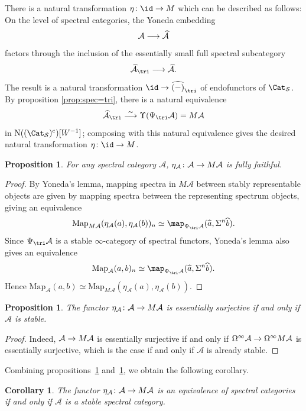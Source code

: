 \documentclass{amsart}
\renewcommand{\to}{\mathchoice{\longrightarrow}{\rightarrow}{\rightarrow}{\rightarrow}}
\newcommand{\cA}{{\mathcal A}}
\let\catsymbfont\mathcal
\newcommand{\aA}{{\catsymbfont{A}}}
\newcommand{\N}{\mathrm{N}}
\newcommand{\Map}{\mathrm{Map}}%
\newcommand{\Spcat}{\Cat_\mathcal{S}}%
\renewcommand{\i}{\infty}
\newcommand{\spect}{\Upsilon}
\numberwithin{equation}{section}
\newtheorem{corollary}[equation]{Corollary}
\newtheorem{proposition}[equation]{Proposition}
\theoremstyle{definition}
\begin{document}
There is a natural transformation $\eta\colon\id\to M$ which can be
described as follows:  
On the level of spectral categories, the Yoneda embedding
\[
\cA\to\widehat{\cA}
\]
factors through the inclusion of the essentially small full spectral subcategory
\[
\widehat{\cA}_{\tri}\to\widehat{\cA}.
\]
The result is a natural transformation $\id\to\widehat{(-)}_{\tri}$ of endofunctors of $\Spcat$.
By proposition \ref{prop:spec=tri}, there is a natural equivalence
\[
\widehat{\cA}_{\tri}\overset{\sim}{\longrightarrow}\spect(\Psi_{\tri}\cA)=M\cA
\]
in $\N((\Spcat)^{\mathrm{c}})[W^{-1}]$; composing with this natural equivalence
gives the desired natural transformation $\eta\colon\id\to M$. 

\begin{proposition}\label{ff}
For any spectral category $\aA$,
$\eta_{\aA}\colon\aA\to M\aA$ is fully faithful.
\end{proposition}

\begin{proof}
By Yoneda's lemma, mapping spectra in $M\aA$ between stably representable objects are given by mapping spectra between the representing spectrum objects, giving an equivalence
\[
\Map_{M\aA}(\eta_{\aA}(a),\eta_{\aA}(b))_n\simeq\map_{\Psi_{\tri}\aA}(\widehat{a},{\Sigma^n}{\widehat{b}}).
\]
Since $\Psi_{\tri}\aA$ is a stable $\i$-category of spectral functors, Yoneda's lemma also gives an equivalence
\[
\Map_{\aA}(a,b)_n\simeq\map_{\Psi_{\tri}\aA}(\widehat{a},{\Sigma^n}{\widehat{b}}).
\]
Hence $\Map_{\aA}(a,b)\simeq\Map_{M\aA}(\eta_{\aA}(a),\eta_{\aA}(b))$.
\end{proof}

\begin{proposition}\label{es}
The functor $\eta_{\aA}\colon{\aA}\to M\aA$ is essentially surjective if and
only if ${\aA}$ is stable.
\end{proposition}

\begin{proof}
Indeed, ${\aA}\to M{\aA}$ is essentially surjective if and only if $\Omega^\i
\aA\to\Omega^\i M\aA$ is essentially surjective, which is the case if and
only if $\aA$ is already stable.
\end{proof}

Combining propositions~\ref{ff} and~\ref{es}, we obtain the following
corollary.

\begin{corollary}\label{Mequiv}
The functor $\eta_{\aA}\colon\aA\to M\aA$ is an equivalence of spectral
categories if and only if $\aA$ is a stable spectral category.
\end{corollary}
\end{document}
